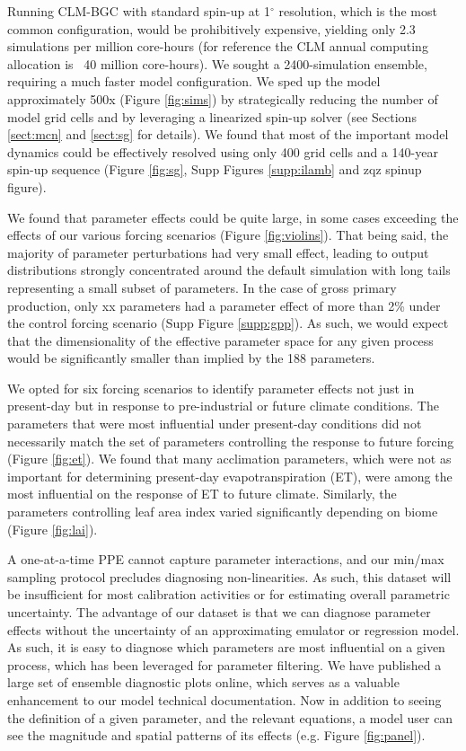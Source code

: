 \documentclass[draft]{agujournal2019}
\begin{document}
Running CLM-BGC with standard spin-up at 1$^\circ$ resolution, which is the most common configuration, would be prohibitively expensive, yielding only 2.3 simulations per million core-hours (for reference the CLM annual computing allocation is ~40 million core-hours). We sought a 2400-simulation ensemble, requiring a much faster model configuration. We sped up the model approximately 500x (Figure \ref{fig:sims}) by strategically reducing the number of model grid cells and by leveraging a linearized spin-up solver (see Sections \ref{sect:mcn} and \ref{sect:sg} for details). We found that most of the important model dynamics could be effectively resolved using only 400 grid cells and a 140-year spin-up sequence (Figure \ref{fig:sg}, Supp Figures \ref{supp:ilamb} and zqz spinup figure).

We found that parameter effects could be quite large, in some cases exceeding the effects of our various forcing scenarios (Figure \ref{fig:violins}). That being said, the majority of parameter perturbations had very small effect, leading to output distributions strongly concentrated around the default simulation with long tails representing a small subset of parameters. In the case of gross primary production, only xx parameters had a parameter effect of more than 2\% under the control forcing scenario (Supp Figure \ref{supp:gpp}). As such, we would expect that the dimensionality of the effective parameter space for any given process would be significantly smaller than implied by the 188 parameters.

We opted for six forcing scenarios to identify parameter effects not just in present-day but in response to pre-industrial or future climate conditions. The parameters that were most influential under present-day conditions did not necessarily match the set of parameters controlling the response to future forcing (Figure \ref{fig:et}). We found that many acclimation parameters, which were not as important for determining present-day evapotranspiration (ET), were among the most influential on the response of ET to future climate. Similarly, the parameters controlling leaf area index varied significantly depending on biome (Figure \ref{fig:lai}).

A one-at-a-time PPE cannot capture parameter interactions, and our min/max sampling protocol precludes diagnosing non-linearities. As such, this dataset will be insufficient for most calibration activities or for estimating overall parametric uncertainty. The advantage of our dataset is that we can diagnose parameter effects without the uncertainty of an approximating emulator or regression model. As such, it is easy to diagnose which parameters are most influential on a given process, which has been leveraged for parameter filtering. We have published a large set of ensemble diagnostic plots online, which serves as a valuable enhancement to our model technical documentation. Now in addition to seeing the definition of a given parameter, and the relevant equations, a model user can see the magnitude and spatial patterns of its effects (e.g. Figure \ref{fig:panel}).
\end{document}
